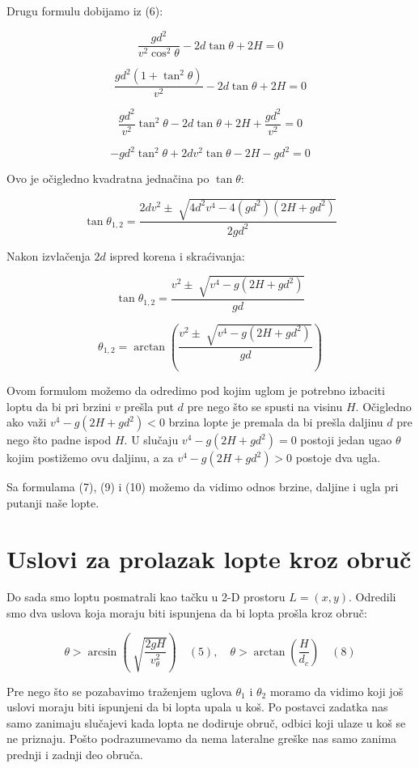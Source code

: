 \documentclass[a4paper, 12pt]{article}
\begin{document}
Drugu formulu dobijamo iz (6):

\[ \dfrac{g d^2}{v^2 \cos^2 \theta} - 2 d \tan \theta + 2 H = 0 \]

\[ \dfrac{g d^2 (1 + \tan^2 \theta)}{v^2} - 2 d \tan \theta + 2 H = 0 \]

\[ \dfrac{g d^2}{v^2} \tan^2 \theta - 2 d \tan \theta + 2 H + \dfrac{g d^2}{v^2} = 0 \]

\[ -g d^2 \tan^2 \theta + 2 d v^2 \tan \theta - 2 H - g d^2 = 0 \]

Ovo je očigledno kvadratna jednačina po $\tan \theta$:

\[ \tan \theta_{1,2} = \dfrac{2 d v^2 \pm \sqrt[]{4 d^2 v^4 - 4 (g d^2)(2 H + g d^2)}}{2 g d^2} \]

Nakon izvlačenja $2d$ ispred korena i skraćivanja:

\[ \tan \theta_{1,2} = \dfrac{v^2 \pm \sqrt[]{v^4 - g(2 H + g d^2)}}{g d} \]

\begin{equation}
\theta_{1,2} = \arctan (\dfrac{v^2 \pm \sqrt[]{v^4 - g(2 H + g d^2)}}{g d})
\end{equation}

Ovom formulom možemo da odredimo pod kojim uglom je potrebno izbaciti loptu da bi pri brzini $v$ prešla put $d$ pre nego što se spusti na visinu $H$.
Očigledno ako važi $v^4 - g(2 H + g d^2) < 0$ brzina lopte je premala da bi prešla daljinu $d$ pre nego što padne ispod $H$. U slučaju $v^4 - g(2 H + g d^2) = 0$ postoji jedan ugao $\theta$ kojim postižemo ovu daljinu, a za $v^4 - g(2 H + g d^2) > 0$ postoje dva ugla.


Sa formulama (7), (9) i (10) možemo da vidimo odnos brzine, daljine i ugla pri putanji naše lopte.

\pagebreak



\section{Uslovi za prolazak lopte kroz obruč}

Do sada smo loptu posmatrali kao tačku u 2-D prostoru $L = (x,y)$. Odredili smo dva uslova koja moraju biti ispunjena da bi lopta prošla kroz obruč:

\[{\theta} > \arcsin(\sqrt[]{\dfrac{2 g H}{v_{\theta}^2}}) \quad (5), \quad {\theta} > \arctan(\dfrac{H}{d_c}) \quad (8) \]

Pre nego što se pozabavimo traženjem uglova $\theta_1$ i $\theta_2$ moramo da vidimo koji još uslovi moraju biti ispunjeni da bi lopta upala u koš. Po postavci zadatka nas samo zanimaju slučajevi kada lopta ne dodiruje obruč, odbici koji ulaze u koš se ne priznaju. Pošto podrazumevamo da nema lateralne greške nas samo zanima prednji i zadnji deo obruča.
\end{document}
